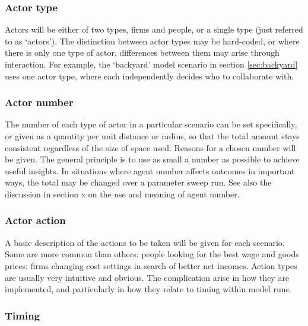 \subsubsection{Actor type}

Actors will be either of two types, firms and people, or a single type (just referred to as `actors'). The distinction between actor types may be hard-coded, or where there is only one type of actor, differences between them may arise through  interaction. For example, the `backyard' model scenario in section \ref{sec:backyard} uses one actor type, where each independently decides who to collaborate with.

\subsubsection{Actor number}

The number of each type of actor in a particular scenario can be set specifically, or given as a quantity per unit distance or radius, so that the total amount stays consistent regardless of the size of space used. Reasons for a chosen number will be given. The general principle is to use as small a number as possible to achieve useful insights. In situations where agent number affects outcomes in important ways, the total may be changed over a parameter sweep run. See also the discussion in section x on the use and meaning of agent number.


\subsubsection{Actor action}

A basic description of the actions to be taken will be given for each scenario. Some are more common than others: people looking for the best wage and goods prices; firms changing cost settings in search of better net incomes. Action types are usually very intuitive and obvious. The complication arise in how they are implemented, and particularly in how they relate to timing within model runs. 

\subsubsection{Timing}

